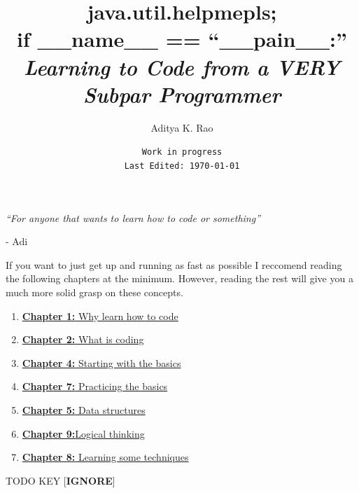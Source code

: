\documentclass[12pt,a4paper]{book}
\newenvironment{dedication}
{%
	\thispagestyle{empty}%
	\vspace*{\stretch{1}}%
	\raggedleft          %
}
{\par %
	\vspace{\stretch{3}} %
	\clearpage           %
}
\begin{document}
	\title{java.util.helpmepls; \\
	if \_\_name\_\_ == ``\_\_pain\_\_:'' \\
	\large{\textit{Learning to Code from a VERY Subpar Programmer}}}
	\author{Aditya K. Rao}
	\date{\texttt{Work in progress \\ Last Edited: \today}}
	\maketitle

	\begin{dedication}
		\textit{``For anyone that wants to learn how to code or something''}
		\par   %
		
		\vspace{\baselineskip}
		- Adi
	\end{dedication}
	
	\tableofcontents

	If you want to just get up and running as fast as possible I reccomend reading the following chapters at the minimum. However, reading the rest will give you a much more solid grasp on these concepts.
	\begin{enumerate}
		\item \href{chap:why-code}{\textbf{Chapter 1:} Why learn how to code}
		\item \href{chap:intro-coding}{\textbf{Chapter 2:} What is coding}
		\item \href{chap:basics}{\textbf{Chapter 4:} Starting with the basics}
		\item \href{chap:basics-practice}{\textbf{Chapter 7:} Practicing the basics}
		\item \href{chap:basics}{\textbf{Chapter 5:} Data structures}
		\item \href{chap:logical-thinking}{\textbf{Chapter 9:}Logical thinking}
		\item \href{chap:techniques}{\textbf{Chapter 8:} Learning some techniques}
	\end{enumerate}

	\listoftodos
	TODO KEY [\textbf{IGNORE}]
\end{document}
